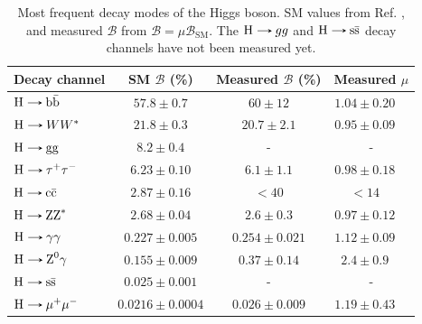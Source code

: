 \begin{table}[!ht]
    \centering
    \begin{tabular}{|l|c|c|cc|}
        \hline
        \multicolumn{1}{|c|}{\cellcolor{lightgray}Decay channel} & \cellcolor{lightgray} SM $\mathcal{B}$ (\%) & \cellcolor{lightgray} Measured $\mathcal{B}$ (\%) & \multicolumn{2}{c|}{\cellcolor{lightgray} Measured $\mu$} \\ \hline
        $\text{H}\decaysto \text{b}\bar{\text{b}}$     & $57.8 \pm 0.7$        & $60 \pm 12$         & $1.04 \pm 0.20$ & \cite{CMS:2018nsn}  \\
        $\text{H}\decaysto WW^*$         & $21.8 \pm 0.3$        & $20.7 \pm 2.1$      & $0.95 \pm 0.09$ & \cite{CMS:2022uhn}  \\
        $\text{H}\decaysto \text{gg}$           & $8.2 \pm 0.4$         & -                   & \multicolumn{2}{c|}{-}                \\
        $\text{H}\decaysto \tau^+\tau^-$ & $6.23 \pm 0.10$       & $6.1 \pm 1.1$       & $0.98 \pm 0.18$ & \cite{CMS:2017zyp}  \\
        $\text{H}\decaysto \text{c}\bar{\text{c}}$     & $2.87 \pm 0.16$       & $<40$               & $<14$ & \cite{CMS:2022psv}            \\
        $\text{H}\decaysto \text{ZZ}^*$         & $2.68 \pm 0.04$       & $2.6 \pm 0.3$       & $0.97 \pm 0.12$ & \cite{CMS:2022dwd}  \\
        $\text{H}\decaysto \gamma\gamma$ & $0.227 \pm 0.005$     & $0.254 \pm 0.021$   & $1.12 \pm 0.09$ & \cite{CMS:2021kom}  \\
        $\text{H}\decaysto \text{Z}^0\gamma$      & $0.155 \pm 0.009$     & $0.37 \pm 0.14$     & $2.4 \pm 0.9$ & \cite{CMS:2022ahq}    \\
        $\text{H}\decaysto \text{s}\bar{\text{s}}$     & $0.025 \pm 0.001$     & -                   & \multicolumn{2}{c|}{-}                \\
        $\text{H}\decaysto \mu^+\mu^-$   & $0.0216 \pm 0.0004$   & $0.026 \pm 0.009$   & $1.19 \pm 0.43$ & \cite{CMS:2020xwi}  \\ \hline
    \end{tabular}
    \caption{Most frequent decay modes of the Higgs boson. SM values from Ref. \cite{LHCHiggsCrossSectionWorkingGroup:2016ypw, CMS:2022dwd}, and measured $\mathcal{B}$ from $\mathcal{B}=\mu\mathcal{B}_{\text{SM}}$. The $\text{H}\protect\decaysto gg$ and $\text{H}\protect\decaysto \text{s}\bar{\text{s}}$ decay channels have not been measured yet.}
    \label{tab:Higgs_decays}
\end{table}

